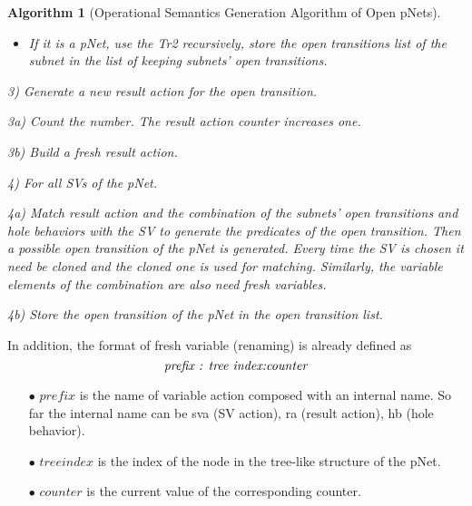 \documentclass{lncs/llncs}
\newtheorem{algorithm}[theorem]{Algorithm}
\begin{document}
\begin{algorithm}[Operational Semantics Generation Algorithm of Open pNets]
\begin{itemize}
           2b) Build a fresh hole behavior.
           
           2c) Generate the hole behavior. Store it in the hole behaviors list of the open transition.
           
        \item If it is a pNet, use the Tr2 recursively, store the open transitions list of the subnet in the list of keeping subnets' open transitions.
       
	\end{itemize}

 3) Generate a new result action for the open transition.
 
       3a) Count the number. The result action counter increases one.
       
       3b) Build a fresh result action.
       
 4) For all SVs of the pNet.
 
       4a) Match result action and the combination of the subnets' open transitions and hole behaviors with the SV to generate the predicates of the open transition. Then a possible open transition of the pNet is generated. Every time the SV is chosen it need be cloned and the cloned one is used for matching.  Similarly, the variable elements of the combination are also need fresh variables.
           
       4b) Store the open transition of the pNet in the open transition list.
       
\end{algorithm}

In addition, the format of fresh variable (renaming) is already defined as
$$\emph{prefix : tree\ index:counter}$$
\begin{itemize}
   \item[$\bullet$] $prefix$ is the name of variable action composed with an internal name. So far the internal name can be  sva (SV action), ra (result action), hb (hole behavior).
   \item[$\bullet$] $tree index$ is the index of the node in the tree-like structure of the pNet.
   \item[$\bullet$] $counter$ is the current value of the corresponding counter.
\end{itemize}
\end{document}
